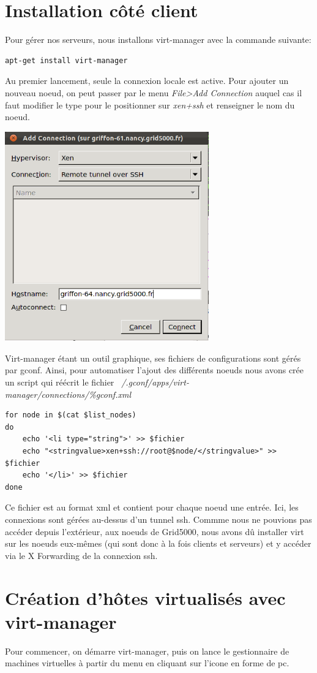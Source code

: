 \section{Installation côté client}
Pour gérer nos serveurs, nous installons virt-manager avec la commande suivante:
\begin{lstlisting} 
apt-get install virt-manager
\end{lstlisting}
Au premier lancement, seule la connexion locale est active. Pour ajouter un nouveau noeud, on peut passer par le menu \emph{File>Add Connection} auquel cas il faut modifier le type pour le positionner sur \emph{xen+ssh} et renseigner le nom du noeud.
\begin{center}
\includegraphics[width=250pt]{images/nouvelle_conn.png}
\end{center}
Virt-manager étant un outil graphique, ses fichiers de configurations sont gérés par gconf. Ainsi, pour automatiser l'ajout des différents noeuds nous avons crée un script qui réécrit le fichier \emph{~/.gconf/apps/virt-manager/connections/\%gconf.xml}
\begin{lstlisting}
for node in $(cat $list_nodes)
do
    echo '<li type="string">' >> $fichier
    echo "<stringvalue>xen+ssh://root@$node/</stringvalue>" >> $fichier
    echo '</li>' >> $fichier
done
\end{lstlisting}
Ce fichier est au format xml et contient pour chaque noeud une entrée. Ici, les connexions sont gérées au-dessus d'un tunnel ssh. Commme nous ne pouvions pas accéder depuis l'extérieur, aux noeuds de Grid5000, nous avons dû installer virt sur les noeuds eux-mêmes (qui sont donc à la fois clients et serveurs) et y accéder via le X Forwarding de la connexion ssh.
\section{Création d'hôtes virtualisés avec virt-manager}
Pour commencer, on démarre virt-manager, puis on lance le gestionnaire de machines virtuelles à partir du menu en cliquant sur l'icone en forme de pc.

